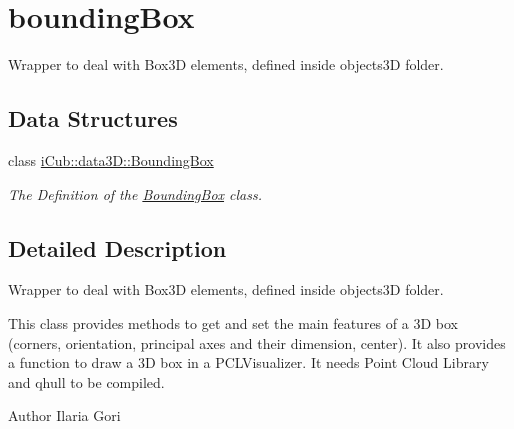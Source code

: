 \section{bounding\+Box}
\label{group__boundingBox}


Wrapper to deal with Box3\+D elements, defined inside objects3\+D folder.  


\subsection*{Data Structures}
\begin{DoxyCompactItemize}
\item 
class \hyperlink{classiCub_1_1data3D_1_1BoundingBox}{i\+Cub\+::data3\+D\+::\+Bounding\+Box}
\begin{DoxyCompactList}\small\item\em The Definition of the \hyperlink{classiCub_1_1data3D_1_1BoundingBox}{Bounding\+Box} class. \end{DoxyCompactList}\end{DoxyCompactItemize}


\subsection{Detailed Description}
Wrapper to deal with Box3\+D elements, defined inside objects3\+D folder. 

This class provides methods to get and set the main features of a 3\+D box (corners, orientation, principal axes and their dimension, center). It also provides a function to draw a 3\+D box in a P\+C\+L\+Visualizer. It needs Point Cloud Library and qhull to be compiled.

\begin{DoxyAuthor}{Author}
Ilaria Gori 
\end{DoxyAuthor}
